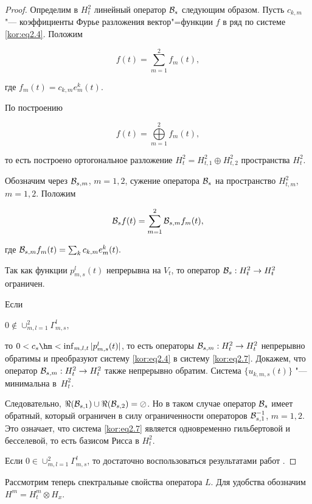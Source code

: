 \begin{proof} Определим в $H_t^2$ линейный оператор ${\cal B}_s$ следующим образом. Пусть $c_{k,m}$ "--- коэффициенты Фурье разложения вектор"=функции $f$ в ряд по системе \eqref{kor:eq2.4}. Положим

$$

f(t)=\sum_{m=1}^2f_m(t),$$ 

где $f_m(t)=c_{k,m}e_m^k(t).$

По построению 

$$f(t)=\bigoplus\limits_{m=1}^2f_m(t),$$ 

то есть построено ортогональное разложение $H_t^2=H_{t,1}^2\oplus H_{t,2}^2$ пространства $H_t^2$. 

Обозначим через ${\cal B}_{s,m}$, $m=1,2$, сужение оператора ${\cal B}_{s}$ на пространство $H_{t,m}^2$, $m=1,2$. Положим

$$

{\cal B}_sf(t)=\sum_{m=1}^2{\cal B}_{s,m}f_m(t),$$ 

где ${\cal B}_{s,m}f_m(t)=\sum_k c_{k,m}e_m^k(t).$

Так как функции $p_{m,s}^l(t)$ непрерывна на $V_t$, то оператор ${\cal B}_s:H_t^2\to H_t^2$ ограничен. 

Если 

$0\notin\cup_{m,l=1}^2\Gamma_{m,s}^l,$ 

то $0<c_s \hm <\inf_{m,l,t}|p_{m,s}^l(t)|$, то есть операторы ${\cal B}_{s,m}:H_t^2\to H_t^2$ непрерывно обратимы и преобразуют систему \eqref{kor:eq2.4} в систему \eqref{kor:eq2.7}. Докажем, что оператор ${\cal B}_{s,m}:H_t^2\to H_t^2$ также непрерывно обратим. Система $\{u_{k,m,s}(t)\}$ "--- минимальна в~$H_t^2$. 

Следовательно, $\Re({\cal B}_{s,1})\cup\Re({\cal B}_{s,2})=\oslash$. Но в таком случае оператор ${\cal B}_{s}$ имеет обратный, который ограничен в силу ограниченности операторов ${\cal B}_{s,1}^{-1}$, $m=1,2$. Это означает, что система \eqref{kor:eq2.7} является одновременно гильбертовой и бесселевой, то есть базисом Рисса в $H_t^2$.



Если $0\in\cup_{m,l=1}^2\Gamma_{m,s}^l$, то достаточно воспользоваться результатами работ \cite{kor:bib6, kor:bib7}. \end{proof}



\smallskip



Рассмотрим теперь спектральные свойства оператора $L$. Для удобства обозначим $H^m=H_t^m\otimes H_x$. 



